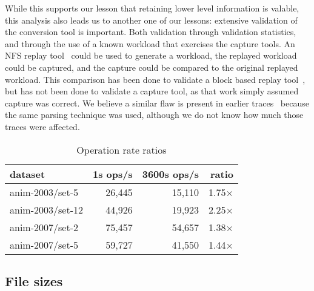 While this supports our lesson that retaining lower level information
is valable, this analysis also leads us to another one of our lessons:
extensive validation of the conversion tool is important.  Both
validation through validation statistics, and through the use of a
known workload that exercises the capture tools.  An NFS replay
tool~\cite{NingningFast05} could be used to generate a workload, the
replayed workload could be captured, and the capture could be compared
to the original replayed workload.  This comparison has been done to
validate a block based replay tool~\cite{AndersonFast04}, but has not
been done to validate a capture tool, as that work simply assumed
capture was correct.
We believe a similar
flaw is present in earlier traces~\cite{ellardTraces} because the same
parsing technique was used, although we do not know how much those traces were
affected.

\begin{table}
\begin{center}
\begin{tabular}{|l|r|r|r|}
\hline
dataset & 1s ops/s & 3600s ops/s & ratio \\
\hline
anim-2003/set-5  & 26,445 & 15,110 & 1.75$\times$ \\
anim-2003/set-12 & 44,926 & 19,923 & 2.25$\times$ \\
anim-2007/set-2  & 75,457 & 54,657 & 1.38$\times$ \\
anim-2007/set-5  & 59,727 & 41,550 & 1.44$\times$ \\
\hline
\end{tabular}
\end{center}
\vspace{-0.1in}
\caption{Operation rate ratios}
\label{table:99quant-differences}
\end{table}

\subsection{File sizes}

